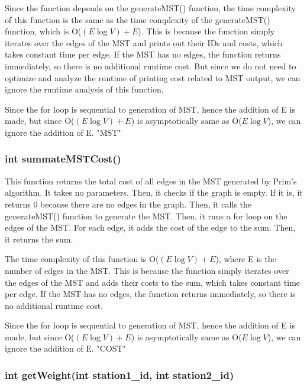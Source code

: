 \documentclass[a4paper]{article}
\begin{document}
			Since the function depends on the {\color{draculapurple}generateMST()} function, the time complexity of this function is the same as the time 
			complexity of the {\color{draculapurple}generateMST()} function, which is {\color{lightblue}O($(E \log V)+E$)}. This is because the function 
			simply iterates over the edges of the MST and prints out their IDs and costs, which takes constant time per edge. If the MST has no edges, the 
			function returns immediately, so there is no additional runtime cost.
			But since we do not need to optimize and analyze the runtime of printing cost related to MST output, we can ignore the runtime analysis of this function.
			

			Since the for loop is sequential to generation of MST, hence the addition of E is made, but since {\color{lightblue}O($(E \log V)+E$)} is asymptotically same as {\color{lightblue}O($E \log V$)}, we can ignore the addition of E.
			{\color{GoldenYellow}"MST"}

		\subsubsection{{\color{orange}int} {\color{draculapurple}summateMSTCost}()}

			This function returns the total cost of all edges in the MST generated by Prim's algorithm. It takes no parameters.
			Then, it checks if the graph is empty. If it is, it returns {\color{draculapurple}0} because there are no edges in the graph.
			Then, it calls the {\color{draculapurple}generateMST()} function to generate the MST. Then, it runs a for loop on the edges of the MST. For each edge, it adds the cost of the edge to the sum.
			Then, it returns the sum.

			The time complexity of this function is {\color{lightblue}O($(E \log V)+E$)}, where {\color{draculapurple}E} is the number of edges in the MST. 
			This is because the function simply iterates over the edges of the MST and adds their costs to the sum, which takes constant time per edge. If 
			the MST has no edges, the function returns immediately, so there is no additional runtime cost.

			Since the for loop is sequential to generation of MST, hence the addition of E is made, but since {\color{lightblue}O($(E \log V)+E$)} is asymptotically same as {\color{lightblue}O($E \log V$)}, we can ignore the addition of E.
			{\color{GoldenYellow}"COST"}


		\subsubsection{{\color{orange}int} {\color{draculapurple}getWeight}({\color{orange}int} station1\_id, {\color{orange}int} station2\_id)}
\end{document}
